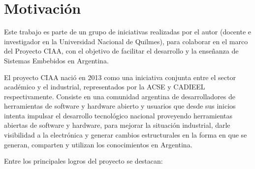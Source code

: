 \section{Motivación}
\label{sec:motivacion}

Este trabajo es parte de un grupo de iniciativas realizadas por el autor (docente e investigador en la Universidad Nacional de Quilmes), para colaborar en el marco del Proyecto CIAA, con el objetivo de facilitar el desarrollo y la enseñanza de Sistemas Embebidos en Argentina.

El proyecto CIAA nació en 2013 como una iniciativa conjunta entre el sector académico y el industrial, representados por la ACSE \citep{ACSE} y CADIEEL \citep{CADIEEL} respectivamente. Consiste en una comunidad argentina de desarrolladores de herramientas de software y hardware abierto y usuarios que desde sus inicios intenta impulsar el desarrollo tecnológico nacional proveyendo herramientas abiertas de software y hardware, para mejorar la situación industrial, darle visibilidad a la electrónica y generar cambios estructurales en la forma en que se generan, comparten y utilizan los conocimientos en Argentina.


Entre los principales logros del proyecto se destacan:

